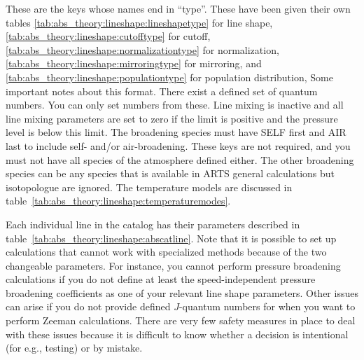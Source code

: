 \begin{table}[ht!]
{These are the keys whose names end in ``type''.
These have been given their own tables
\ref{tab:abs_theory:lineshape:lineshapetype} for line shape,
\ref{tab:abs_theory:lineshape:cutofftype} for cutoff, 
\ref{tab:abs_theory:lineshape:normalizationtype} for normalization,
\ref{tab:abs_theory:lineshape:mirroringtype} for mirroring, and
\ref{tab:abs_theory:lineshape:populationtype} for population distribution,
Some important notes about this format. 
There exist a defined set of quantum numbers.  You can only set numbers
from these.
Line mixing is inactive and all line mixing parameters are set to zero 
if the limit is positive and the pressure level is below this limit.  The broadening species must have SELF first
and AIR last to include self- and/or air-broadening.  These keys are not required,
and you must not have all species of the atmosphere defined either.
The other broadening species can be any species that is available in ARTS general
calculations but isotopologue are ignored.
The temperature models are discussed in table~\ref{tab:abs_theory:lineshape:temperaturemodes}.
}
\label{tab:abs_theory:lineshape:abscatglob}
\end{table}

Each individual line in the catalog has their parameters
described in table~\ref{tab:abs_theory:lineshape:abscatline}.
Note that it is possible to set up calculations that cannot
work with specialized methods because of the two changeable
parameters.  For instance, you cannot perform pressure broadening
calculations if you do not define at least the speed-independent
pressure broadening coefficients as one of your relevant line shape
parameters.  Other issues can arise if you do not provide defined
$J$-quantum numbers for when you want to perform Zeeman calculations.
There are very few safety measures in place to deal with these issues
because it is difficult to know whether a decision is intentional 
(for e.g., testing) or by mistake.

